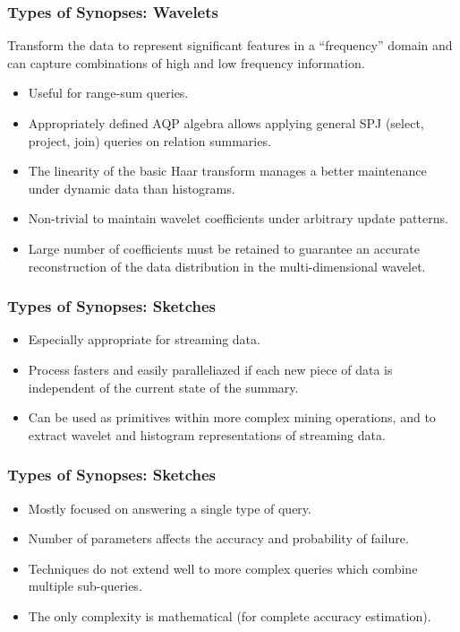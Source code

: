 \documentclass{beamer}
\begin{document}
\begin{frame}
\frametitle{Types of Synopses: Wavelets}
Transform the data to represent significant features in a “frequency” domain and can capture combinations of high and low frequency information.\pause
\begin{itemize}
\item{Useful for range-sum queries.}
\item{Appropriately defined AQP algebra allows applying general SPJ (select, project, join) queries on relation summaries.}
\item{The linearity of the basic Haar transform manages a better maintenance under dynamic data than histograms.}
\item{Non-trivial to maintain wavelet coefficients under arbitrary update patterns.}
\item{Large number of coefficients must be retained to guarantee an accurate reconstruction of the data distribution in the multi-dimensional wavelet.}
\end{itemize}
\end{frame}

\begin{frame}
\frametitle{Types of Synopses: Sketches}
\begin{itemize}
\item{Especially appropriate for streaming data.}
\item{Process fasters and easily paralleliazed if each new piece of data is independent of the current state of the summary.}
\item{Can be used as primitives within more complex mining operations, and to extract wavelet and histogram representations of streaming data.}
\end{itemize}
\end{frame}

\begin{frame}
\frametitle{Types of Synopses: Sketches}
\begin{itemize}
\item{Mostly focused on answering a single type of query.}
\item{Number of parameters affects the accuracy and probability of failure.}
\item{Techniques do not extend well to more complex queries which combine multiple sub-queries.}
\item{The only complexity is mathematical (for complete accuracy estimation).}
\end{itemize}
\end{frame}
\end{document}
